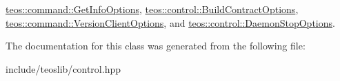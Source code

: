 \mbox{\hyperlink{classteos_1_1command_1_1_get_info_options_af5b6ec0a42f019ef1058e6f78a84346d}{teos\+::command\+::\+Get\+Info\+Options}}, \mbox{\hyperlink{classteos_1_1control_1_1_build_contract_options_ac45a323c2bc0c79b97b1d0d1d8afbf4f}{teos\+::control\+::\+Build\+Contract\+Options}}, \mbox{\hyperlink{classteos_1_1command_1_1_version_client_options_a28b69107e8eb50a2faf9594958bb1d6d}{teos\+::command\+::\+Version\+Client\+Options}}, and \mbox{\hyperlink{classteos_1_1control_1_1_daemon_stop_options_a99e7d5a47cd20e4ad437049263cd367a}{teos\+::control\+::\+Daemon\+Stop\+Options}}.



The documentation for this class was generated from the following file\+:\begin{DoxyCompactItemize}
\item 
include/teoslib/control.\+hpp\end{DoxyCompactItemize}
